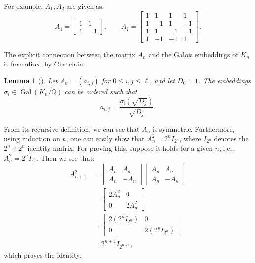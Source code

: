 \documentclass{amsart}
\newcommand{\Q}{\mathbb{Q}}
\theoremstyle{plain}
\newtheorem{lemma}[theorem]{Lemma}
\theoremstyle{definition}
\theoremstyle{remark}
\numberwithin{equation}{section}
\begin{document}
For example, $A_1, A_2$ are given as:
\[ 
    A_1 = \begin{bmatrix}
        1 &  1 \\
        1 & -1
    \end{bmatrix}, \qquad 
    A_2 = \begin{bmatrix}
        1 &  1 &  1 &  1 \\
        1 & -1 &  1 & -1 \\
        1 &  1 & -1 & -1 \\
        1 & -1 & -1 &  1
    \end{bmatrix}. 
\]

The explicit connection between the matrix $A_n$ and the Galois embeddings of $K_n$ is formalized by Chatelain:

\begin{lemma}[{\cite[Corollaire 1]{Chatelain}}] \label{lem:galois_matrix}
    Let $A_n = (a_{i,j})$ for $0 \leq i, j \leq \ell$, and let $D_0 = 1$. The embeddings $\sigma_i \in \operatorname{Gal}(K_n/\Q)$ can be ordered such that 
    \[
        a_{i,j} = \frac{\sigma_i(\sqrt{D_j})}{\sqrt{D_j}}.
    \]
\end{lemma}

From its recursive definition, we can see that $A_n$ is symmetric. Furthermore, using induction on $n$, one can easily show that $A_n^2 = 2^n I_{2^n}$, where $I_{2^n}$ denotes the $2^n \times 2^n$ identity matrix. For proving this, suppose it holds for a given $n$, i.e., $A_n^2 = 2^n I_{2^n}$. Then we see that:
\begin{align*}
    A_{n+1}^2 &= \begin{bmatrix}
        A_n & A_n \\
        A_n & -A_n
    \end{bmatrix} 
    \begin{bmatrix}
        A_n & A_n \\
        A_n & -A_n
    \end{bmatrix} \\
    &= \begin{bmatrix}
        2A_n^2 & 0 \\
        0 & 2A_n^2
    \end{bmatrix} \\
    &= \begin{bmatrix}
        2(2^n I_{2^n}) & 0 \\
        0 & 2(2^n I_{2^n})
    \end{bmatrix} \\
    &= 2^{n+1} I_{2^{n+1}},
\end{align*}
which proves the identity. 
\end{document}
